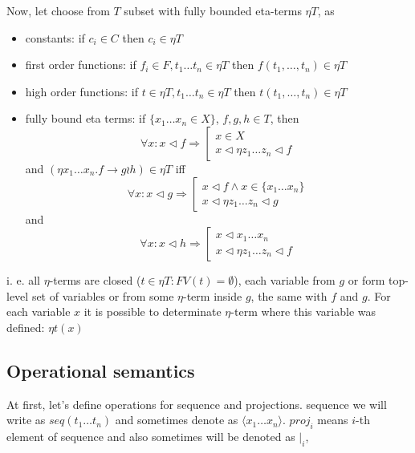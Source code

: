 \documentclass[10pt]{article}
\begin{document}
  Now, let choose from $T$ subset with fully bounded eta-terms ${\eta}{T}$, as
\begin{itemize}
 \item constants: if $c_i \in C$ then $c_i \in {\eta}T$
 \item first order functions: if $f_i \in F, t_{1}\dots t_{n} \in {\eta}T$ 
         then $f(t_1,\dots,t_n)\in {\eta}T$
 \item high order functions: if $t \in {\eta}T, t_{1}\dots t_{n} \in {\eta}T$ 
         then $t(t_1,\dots,t_n)\in {\eta}T$                          
 \item fully bound eta terms: 
 if $\{ x_1 \dots x_n \in X \}$, $f,g,h \in T$, then 
     $$\forall x : x \lhd f \Rightarrow 
          \left[
          \begin{array}{l}
            x \in X \\
            x \lhd \eta z_{1}\dots z_{n} \lhd f 
         \end{array}\right.$$         
       and 
    $(\eta x_{1} \dots x_{n} . f \to g \wr h)\in {\eta}T$ iff 
      $$\forall x : x \lhd g \Rightarrow 
          \left[
          \begin{array}{l}
            x\lhd f \land x \in \{ x_{1} \dots x_n \} \\
            x \lhd \eta z_{1}\dots z_{n} \lhd g 
         \end{array}\right.$$
       and  
     $$\forall x : x \lhd h \Rightarrow 
          \left[
          \begin{array}{l}
            x \lhd x_{1} \dots x_n \\
            x \lhd \eta z_{1}\dots z_{n} \lhd f 
         \end{array}\right.$$         
\end{itemize}

 i. e. all $\eta$-terms are closed ($t \in {\eta}T: FV(t)=\emptyset$), each variable
 from $g$ or form top-level set of variables or from some $\eta$-term inside $g$, the
 same with $f$ and $g$. For each variable $x$ it is possible to determinate $\eta$-term 
 where this variable was defined: $\eta{t}(x)$

\subsection{Operational semantics }

At first, let's define operations for sequence and projections.
sequence we will write as $seq(t_{1}\dots t_{n})$ and sometimes 
denote as $\langle x_{1}\dots x_{n}\rangle$.
 $proj_i$ means $i$-th element of sequence and also sometimes will be
denoted as $|_{i}$, 
\end{document}
